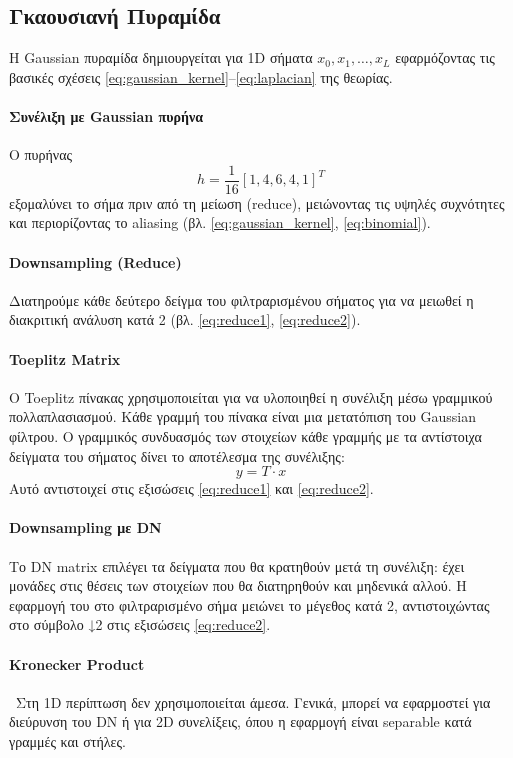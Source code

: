 \documentclass[12pt]{article}
\begin{document}
\subsection{Γκαουσιανή Πυραμίδα}
Η Gaussian πυραμίδα δημιουργείται για 1D σήματα $x_0, x_1, \dots, x_L$ εφαρμόζοντας τις βασικές σχέσεις \eqref{eq:gaussian_kernel}–\eqref{eq:laplacian} της θεωρίας.

\paragraph{Συνέλιξη με Gaussian πυρήνα} \mbox{} 
Ο πυρήνας 
\[
h = \frac{1}{16}[1,4,6,4,1]^T
\]
εξομαλύνει το σήμα πριν από τη μείωση (reduce), μειώνοντας τις υψηλές συχνότητες και περιορίζοντας το aliasing (βλ. \eqref{eq:gaussian_kernel}, \eqref{eq:binomial}).

\paragraph{Downsampling (Reduce)} \mbox{} 

Διατηρούμε κάθε δεύτερο δείγμα του φιλτραρισμένου σήματος για να μειωθεί η διακριτική ανάλυση κατά 2 (βλ. \eqref{eq:reduce1}, \eqref{eq:reduce2}).

\paragraph{Toeplitz Matrix}\mbox{} 

Ο Toeplitz πίνακας χρησιμοποιείται για να υλοποιηθεί η συνέλιξη μέσω γραμμικού πολλαπλασιασμού.  
Κάθε γραμμή του πίνακα είναι μια μετατόπιση του Gaussian φίλτρου.  
Ο γραμμικός συνδυασμός των στοιχείων κάθε γραμμής με τα αντίστοιχα δείγματα του σήματος δίνει το αποτέλεσμα της συνέλιξης:
\[
y = T \cdot x
\]
Αυτό αντιστοιχεί στις εξισώσεις \eqref{eq:reduce1} και \eqref{eq:reduce2}.

\paragraph{Downsampling με DN}\mbox{} 

Το DN matrix επιλέγει τα δείγματα που θα κρατηθούν μετά τη συνέλιξη:  
έχει μονάδες στις θέσεις των στοιχείων που θα διατηρηθούν και μηδενικά αλλού.  
Η εφαρμογή του στο φιλτραρισμένο σήμα μειώνει το μέγεθος κατά 2, αντιστοιχώντας στο σύμβολο ↓2 στις εξισώσεις \eqref{eq:reduce2}.

\paragraph{Kronecker Product}\mbox{} 
\
Στη 1D περίπτωση δεν χρησιμοποιείται άμεσα.  
Γενικά, μπορεί να εφαρμοστεί για διεύρυνση του DN ή για 2D συνελίξεις, όπου η εφαρμογή είναι separable κατά γραμμές και στήλες.
\end{document}
